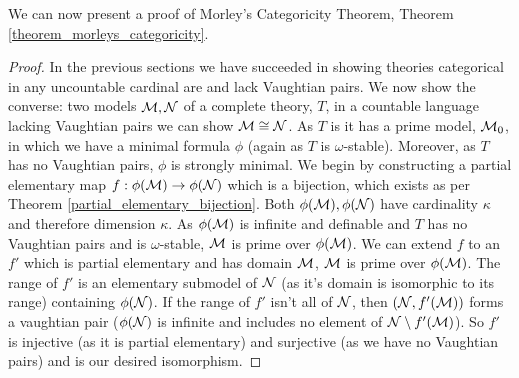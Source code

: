 We can now present a proof of Morley's Categoricity Theorem, Theorem \ref{theorem_morleys_categoricity}.

\begin{proof}
In the previous sections we have succeeded in showing theories categorical in any uncountable cardinal are \omst and lack Vaughtian pairs. 
We now show the converse: two models \(\mathcal{M}, \mathcal{N}\)  of a complete \omst theory, \(T\), in a countable language lacking Vaughtian pairs we can show \(\mathcal{M} \cong \mathcal{N}\). 
As \(T\) is \omst it has a prime model, \(\mathcal{M}_0\), in which we have a minimal formula \(\phi\) (again as \(T\) is \(\omega\)-stable).
Moreover, as \(T\) has no Vaughtian pairs, \(\phi\) is strongly minimal. 
We begin by constructing a partial elementary map \(f:\phi(\mathcal{M}) \to \phi(\mathcal{N})\) which is a bijection, which exists as per Theorem \ref{partial_elementary_bijection}.
Both \(\phi(\mathcal{M}), \phi(\mathcal{N})\) have cardinality \(\kappa\) and therefore dimension \(\kappa\). 
As \(\phi(\mathcal{M})\) is infinite and definable and \(T\) has no Vaughtian pairs and is \(\omega\)-stable, \(\mathcal{M}\) is prime over \(\phi(\mathcal{M})\).
We can extend \(f\) to an \(f'\) which is partial elementary and has domain \(\mathcal{M}\), \(\mathcal{M}\) is prime over \(\phi(\mathcal{M})\).
The range of \(f'\) is an elementary submodel of \(\mathcal{N}\) (as it's domain is isomorphic to its range) containing \(\phi(\mathcal{N})\). 
If the range of \(f'\) isn't all of \(\mathcal{N}\), then \((\mathcal{N}, f'(\mathcal{M}))\) forms a vaughtian pair (\(\phi(\mathcal{N})\) is infinite and includes no element of \(\mathcal{N} \setminus f'(\mathcal{M})\)).  
So \(f'\) is injective (as it is partial elementary) and surjective (as we have no Vaughtian pairs) and is our desired isomorphism. 
\end{proof}
